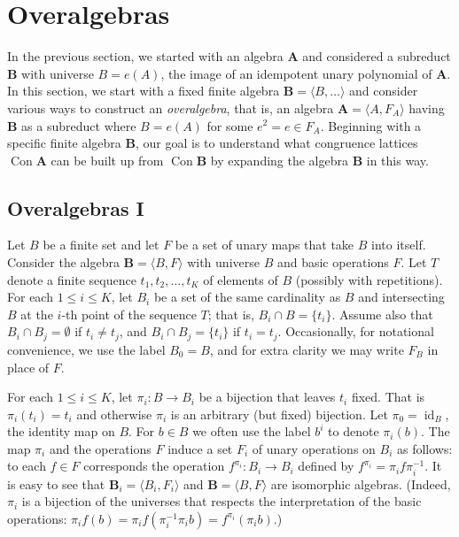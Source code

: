 \documentclass{au}
\numberwithin{equation}{section}
\theoremstyle{plain}
\theoremstyle{definition}
\newcommand{\defeq}{\ensuremath{=}}        %
\newcommand{\<}{\ensuremath{\langle}}
\renewcommand{\>}{\ensuremath{\rangle}}
\newcommand{\bA}{\ensuremath{\mathbf{A}}}
\newcommand{\bB}{\ensuremath{\mathbf{B}}}
\DeclareMathOperator{\id}{id}
\DeclareMathOperator{\Con}{Con}
\renewcommand{\leq}{\ensuremath{\leqslant}}
\begin{document}
\section{Overalgebras}
\label{sec:overalgebras}
In the previous section, we started with an algebra $\bA$ and
considered a subreduct $\bB$ with universe $B = e(A)$, the image of an
idempotent unary polynomial of $\bA$.  In this section, we start with a
fixed finite algebra $\bB = \<B, \dots \>$ and consider various ways to
construct an \emph{overalgebra}, that is, an algebra $\bA= \<A, F_A\>$ having
$\bB$ as a subreduct where $B = e(A)$ for some $e^2 = e \in F_A$.
Beginning with a specific finite algebra $\bB$, our goal is to understand what
congruence lattices $\Con\bA$ can be built up from
$\Con\bB$ by expanding the algebra $\bB$ in this way.

\subsection{Overalgebras I}
\label{sec:overalgebras-i}
Let $B$ be a finite set and let $F$ be a set of unary maps that take $B$
into itself. Consider the algebra $\bB = \<B, F\>$ with universe $B$ and basic operations $F$.
Let $T$ denote a finite sequence $t_1, t_2, \dots, t_K$ of elements of $B$ (possibly with repetitions).
For each $1\leq i \leq K$, let $B_i$ be a set of the same cardinality as $B$
and intersecting $B$ at the $i$-th point of the sequence $T$; that is,
$B_i\cap B = \{t_i\}$.  Assume also that $B_i\cap B_j = \emptyset$ if $t_i\neq t_j$, and
$B_i\cap B_j = \{t_i\}$ if $t_i= t_j$.  Occasionally, for notational convenience, we
use the label $B_0\defeq B$, and for extra clarity we may write
$F_B$ in place of $F$.

For each $1\leq i \leq K$, let $\pi_i\colon  B\rightarrow B_i$ be a bijection that leaves
$t_i$ fixed.  That is $\pi_i(t_i) = t_i$ and otherwise $\pi_i$ is an arbitrary
(but fixed) bijection.  Let $\pi_0 = \id_{B}$, the identity map on $B$.  For
$b\in B$ we often use the label $b^i$ to denote $\pi_i(b)$.  The map $\pi_i$ and
the operations $F$ induce a set $F_i$ of unary operations on $B_i$ as follows:
to each $f\in F$ corresponds the operation $f^{\pi_i} \colon  B_i \rightarrow B_i$
defined by $f^{\pi_i} = \pi_i f \pi_i^{-1}$.
It is easy to see that $\bB_i \defeq  \<B_i, F_i\>$
and $\bB = \<B, F\>$ are isomorphic  algebras.
(Indeed, $\pi_i$ is a bijection of the universes that respects the
interpretation of the basic operations: %
$\pi_if(b) = \pi_i f(\pi_i^{-1}\pi_i b) = f^{\pi_i}(\pi_i b)$.)
\end{document}
